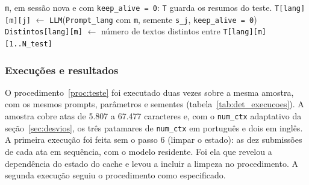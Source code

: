 \documentclass[12pt]{article}
\begin{document}
\begin{procedure}[H]
{{{{        \texttt{m}, em sessão nova e com \texttt{keep\_alive = 0}: \texttt{T}
        guarda os resumos do teste.}
      \texttt{T[lang][m][j]} $\gets$ \texttt{LLM}(\texttt{Prompt\_lang} com
      \texttt{m}, semente \texttt{s\_j}, \texttt{keep\_alive = 0})\;
    }
    \texttt{Distintos[lang][m]} $\gets$ número de textos distintos entre
    \texttt{T[lang][m][1..N\_test]}\;
  }
  \;
}
\end{procedure}

\subsubsection{Execuções e resultados}\label{sec:det-resultados}

O procedimento~\ref{proc:teste} foi executado duas vezes sobre a mesma amostra,
com os mesmos prompts, parâmetros e sementes (tabela~\ref{tab:det_execucoes}).
A amostra cobre atas de 5.807 a 67.477 caracteres e, com o \texttt{num\_ctx}
adaptativo da seção~\ref{sec:desvios}, os três patamares de \texttt{num\_ctx} em
português e dois em inglês. A primeira execução foi feita sem o passo 6
(limpar o estado): as dez submissões de cada ata em sequência, com o modelo
residente. Foi ela que revelou a dependência do estado do cache e levou a
incluir a limpeza no procedimento. A segunda execução seguiu o procedimento como
especificado.
\end{document}
